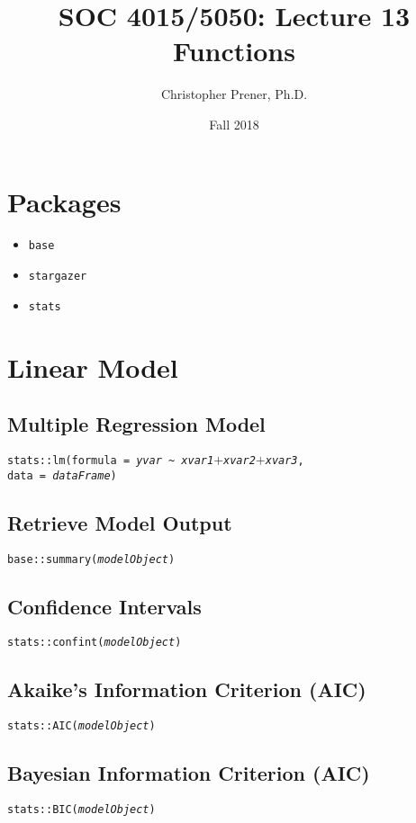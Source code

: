 \documentclass{tufte-handout}
\title{SOC 4015/5050: Lecture 13 Functions}
\author{Christopher Prener, Ph.D.}
\date{Fall 2018}
\newenvironment{subs}
  {\adjustwidth{3em}{0pt}}
  {\endadjustwidth}
\begin{document}
\maketitle %

\vspace{5mm}
\section{Packages}
\begin{itemize}
\item \texttt{base}
\item \texttt{stargazer}
\item \texttt{stats}
\end{itemize}

\vspace{5mm}
\section{Linear Model}
\begin{subs}
\subsection{Multiple Regression Model}
\noindent \texttt{stats::}{\color{red}\texttt{lm}}\texttt{(formula = \textit{yvar} \textasciitilde\ \textit{xvar1}$+$\textit{xvar2}$+$\textit{xvar3}, \\data = \textit{dataFrame})}

\vspace{3mm}
\subsection{Retrieve Model Output}
\noindent \texttt{base::}{\color{red}\texttt{summary}}\texttt{(\textit{modelObject})}

\vspace{3mm}
\subsection{Confidence Intervals}
\noindent \texttt{stats::}{\color{red}\texttt{confint}}\texttt{(\textit{modelObject})}

\vspace{3mm}
\subsection{Akaike's Information Criterion (AIC)}
\noindent \texttt{stats::}{\color{red}\texttt{AIC}}\texttt{(\textit{modelObject})}

\vspace{3mm}
\subsection{Bayesian Information Criterion (AIC)}
\noindent \texttt{stats::}{\color{red}\texttt{BIC}}\texttt{(\textit{modelObject})}
\end{subs}
\end{document}
